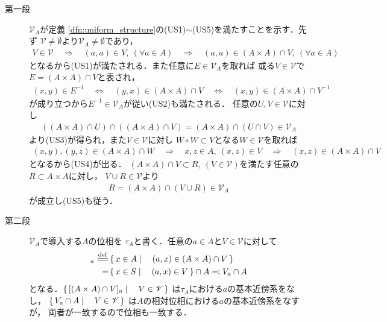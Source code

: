 	\begin{prf}\mbox{}
		\begin{description}
			\item[第一段] $\mathscr{V}_A$が定義
				\ref{dfn:uniform_structure}の(US1)$\sim$(US5)を満たすことを示す．先ず
				$\mathscr{V} \neq \emptyset$より$\mathscr{V}_A \neq \emptyset$であり，
				\begin{align}
					V \in \mathscr{V} \quad \Longrightarrow \quad
					(a,a) \in V,\ (\forall a \in A) \quad \Longrightarrow \quad
					(a,a) \in (A \times A) \cap V,\ (\forall a \in A)
				\end{align}
				となるから(US1)が満たされる．また任意に$E \in \mathscr{V}_A$を取れば
				或る$V \in \mathscr{V}$で$E = (A \times A) \cap V$と表され，
				\begin{align}
					(x,y) \in E^{-1}
					\quad \Longleftrightarrow \quad
					(y,x) \in (A \times A) \cap V 
					\quad \Longleftrightarrow \quad
					(x,y) \in (A \times A) \cap V^{-1}
				\end{align}
				が成り立つから$E^{-1} \in \mathscr{V}_A$が従い(US2)も満たされる．
				任意の$U,V \in \mathscr{V}$に対し
				\begin{align}
					((A \times A) \cap U) \cap ((A \times A) \cap V)
					= (A \times A) \cap (U \cap V) \in \mathscr{V}_A
				\end{align}
				より(US3)が得られ，また$V \in \mathscr{V}$に対し
				$W \circ W \subset V$となる$W \in \mathscr{V}$を取れば
				\begin{align}
					(x,y),(y,z) \in (A \times A) \cap W
					\quad \Longrightarrow \quad
					x,z \in A,\ (x,z) \in V
					\quad \Longrightarrow \quad
					(x,z) \in (A \times A) \cap V
				\end{align}
				となるから(US4)が出る．
				$(A \times A) \cap V \subset R,\ (V \in \mathscr{V})$を満たす任意の
				$R \subset A \times A$に対し，
				$V \cup R \in \mathscr{V}$より
				\begin{align}
					R = (A \times A) \cap (V \cup R) \in \mathscr{V}_A
				\end{align}
				が成立し(US5)も従う．
			
			\item[第二段] $\mathscr{V}_A$で導入する$A$の位相を
				$\tau_A$と書く．任意の$a \in A$と$V \in \mathscr{V}$に対して
				\begin{align}
					[(A \times A) \cap V]_a \defeq
					&\Set{x \in A}{(a,x) \in (A \times A) \cap V} \\
					=& \Set{x \in S}{(a,x) \in V} \cap A
					\eqqcolon V_a \cap A
				\end{align}
				となる．$\left\{\, [(A \times A) \cap V]_a \mid \quad V \in \mathscr{V}\, \right\}$
				は$\tau_A$における$a$の基本近傍系をなし，
				$\left\{\, V_a \cap A \mid \quad V \in \mathscr{V}\, \right\}$
				は$A$の相対位相における$a$の基本近傍系をなすが，
				両者が一致するので位相も一致する．
				\QED
		\end{description}
	\end{prf}
	
